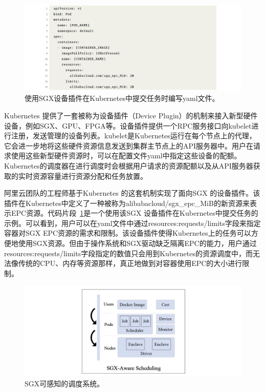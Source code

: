 \begin{figure}[h]
    \centerline{\includegraphics[width=\textwidth]{figures/k8s-yaml.png}}
    \caption{使用SGX设备插件在Kubernetes中提交任务时编写yaml文件。}
    \label{k8s_yaml}
\end{figure}

Kubernetes 提供了一套被称为设备插件（Device Plugin）的机制来接入新型硬件设备，例如SGX、GPU、FPGA等。设备插件提供一个RPC服务接口向kubelet进行注册，发送管理的设备列表。kubelet是Kubernetes运行在每个节点上的代理，它会进一步地将这些硬件资源信息发送到集群主节点上的API服务器中。用户在请求使用这些新型硬件资源时，可以在配置文件yaml中指定这些设备的配额。Kubernetes的调度器在进行调度时会根据用户请求的资源配额以及从API服务器获取的实时资源容量进行资源分配和任务放置。

阿里云团队的工程师基于Kubernetes 的这套机制实现了面向SGX 的设备插件。该插件在Kubernetes中定义了一种被称为alibabacloud/sgx\_epc\_MiB的新资源来表示EPC资源。代码片段~\ref{k8s_yaml}是一个使用该SGX 设备插件在Kubernetes中提交任务的示例。可以看到，用户可以在yaml文件中通过resources:requests/limits字段来指定容器对SGX EPC资源的需求和限制。该设备插件使得Kubernetes上的任务可以方便地使用SGX资源。但由于操作系统和SGX驱动缺乏隔离EPC的能力，用户通过resources:requests/limits字段指定的数值只会用到Kubernetes的资源调度中，而无法像传统的CPU、内存等资源那样，真正地做到对容器使用EPC的大小进行限制。

\begin{figure}[h]
    \centerline{\includegraphics[width=\textwidth]{figures/sgx-aware-sche.png}}
    \caption{SGX可感知的调度系统。}
    \label{sgx_aware_sche}
\end{figure}

